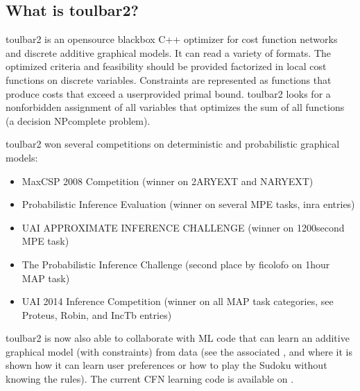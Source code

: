 \documentclass[letterpaper,10pt,openany,oneside,english]{sphinxmanual}
\begin{document}
\subsection{What is toulbar2?}
\label{\detokenize{_files/README:what-is-toulbar2}}\label{\detokenize{_files/README:readme-1}}
\sphinxAtStartPar
toulbar2 is an open\sphinxhyphen{}source black\sphinxhyphen{}box C++ optimizer for cost function
networks and discrete additive graphical models. It can read a variety
of formats. The optimized criteria and feasibility should be provided
factorized in local cost functions on discrete variables. Constraints
are represented as functions that produce costs that exceed a
user\sphinxhyphen{}provided primal bound. toulbar2 looks for a non\sphinxhyphen{}forbidden assignment
of all variables that optimizes the sum of all functions (a decision
NP\sphinxhyphen{}complete problem).

\sphinxAtStartPar
toulbar2 won several competitions on deterministic and probabilistic
graphical models:
\begin{itemize}
\item {} 
\sphinxAtStartPar
Max\sphinxhyphen{}CSP 2008 Competition  (winner on 2\sphinxhyphen{}ARY\sphinxhyphen{}EXT and N\sphinxhyphen{}ARY\sphinxhyphen{}EXT)

\item {} 
\sphinxAtStartPar
Probabilistic Inference Evaluation  (winner on several MPE tasks, inra entries)

\item {} 
 UAI APPROXIMATE INFERENCE CHALLENGE  (winner on 1200\sphinxhyphen{}second MPE task)

\item {} 
\sphinxAtStartPar
The Probabilistic Inference Challenge  (second place by ficolofo on 1\sphinxhyphen{}hour MAP task)

\item {} 
\sphinxAtStartPar
UAI 2014 Inference Competition  (winner on all MAP task categories, see Proteus, Robin, and IncTb entries)

\end{itemize}

\sphinxAtStartPar
toulbar2 is now also able to collaborate with ML code that can learn
an additive graphical model (with constraints) from data (see the
associated
,
and  where it is
shown how it can learn user preferences or how to play the Sudoku
without knowing the rules). The current CFN learning code is available
on .
\end{document}
